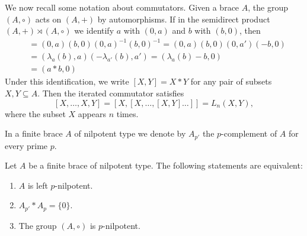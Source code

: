 We now recall some notation about commutators. Given a brace $A$, the group $(A,\circ)$ acts on $(A,+)$ by automorphisms. 
If in the semidirect product $(A,+)\rtimes(A,\circ)$ we identify $a$ with $(0,a)$ and $b$ with $(b,0)$, then 
\begin{align*}
 [a,b] &= (0,a)(b,0)(0,a)^{-1}(b,0)^{-1} = (0,a)(b,0)(0,a')(-b,0) \\
 &=(\lambda_a(b),a)(-\lambda_{a'}(b),a') = (\lambda_a(b)-b,0) \\
 &= (a*b,0)
\end{align*}
Under this identification, we write $[X,Y]=X*Y$ for any pair of subsets $X,Y\subseteq A$. Then the iterated commutator  
satisfies 
\[
[X,\dots, X,Y]=[X,[X,\dots,[X,Y]\dots]]=L_n(X,Y),
\]
where the subset $X$ appears $n$ times.

In a finite brace $A$  of nilpotent type we denote by $A_{p'}$ the $p$-complement of $A$ for every prime $p$.

\begin{theorem}
\label{thm:left_p}
    Let $A$ be a finite brace of nilpotent type. The following statements
    are equivalent:
    \begin{enumerate}
        \item $A$ is left $p$-nilpotent.
        \item $A_{p'}*A_p=\{0\}$.
        \item The group $(A,\circ)$ is $p$-nilpotent.
    \end{enumerate}
\end{theorem}

